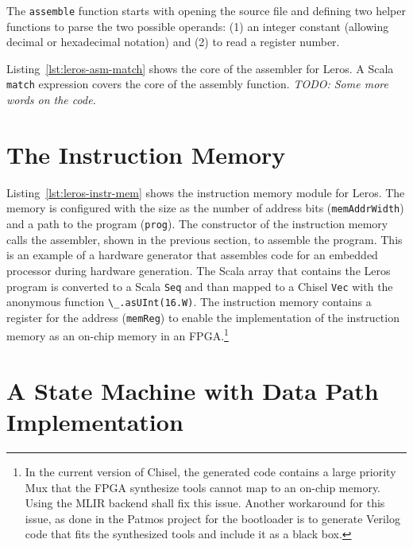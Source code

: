 \documentclass[%
    10pt,
    headinclude, footexclude,
    openright, %
    notitlepage,
    cleardoubleempty,
    headsepline,
    pointlessnumbers,
    bibtotoc, idxtotoc,
    ]{scrbook}
\newcommand{\code}[1]{{\lstinline[basicstyle=\small\ttfamily]{#1}}}
\newcommand{\todo}[1]{{\emph{TODO: #1}}}
\begin{document}

The \code{assemble} function starts with opening the source file
and defining two helper functions to parse the two possible operands: (1) an
integer constant (allowing decimal or hexadecimal notation) and (2) to read
a register number.


Listing~\ref{lst:leros-asm-match} shows the core of the assembler for Leros.
A Scala \code{match} expression covers the core of the assembly function.
\todo{Some more words on the code.}




\section{The Instruction Memory}

Listing~\ref{lst:leros-instr-mem} shows the instruction memory module for Leros.
The memory is configured with the size as the number of address bits (\code{memAddrWidth}) and
a path to the program (\code{prog}). The constructor of the instruction memory calls the
assembler, shown in the previous section, to assemble the program.
This is an example of a hardware generator that assembles code for an
embedded processor during hardware generation.
The Scala array that contains the Leros program is converted to a Scala
\code{Seq} and than mapped to a Chisel \code{Vec} with the anonymous
function \code{\_.asUInt(16.W)}.
The instruction memory contains a register for the address (\code{memReg})
to enable the implementation of the instruction memory as an on-chip memory
in an FPGA.\footnote{In the current version of Chisel, the generated code
contains a large priority Mux that the FPGA synthesize tools cannot map to
an on-chip memory. Using the MLIR backend shall fix this issue.
Another workaround for this issue, as done in the Patmos project for the
bootloader is to generate Verilog code that fits the synthesized tools
and include it as a black box.}



\section{A State Machine with Data Path Implementation}
\end{document}
